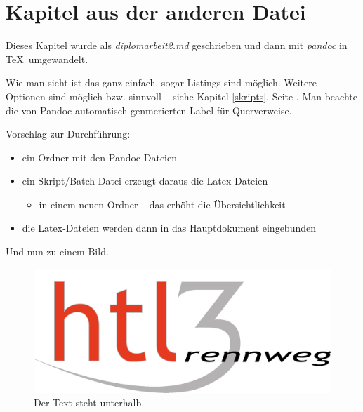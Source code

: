 \hypertarget{kapitel-aus-der-anderen-datei}{%
\section{Kapitel aus der anderen
Datei}\label{kapitel-aus-der-anderen-datei}}

Dieses Kapitel wurde als \emph{diplomarbeit2.md} geschrieben und dann
mit \emph{pandoc} in \TeX~umgewandelt.

\begin{Shaded}
\begin{Highlighting}[]
\end{Highlighting}
\end{Shaded}

Wie man sieht ist das ganz einfach, sogar Listings sind möglich. Weitere
Optionen sind möglich bzw. sinnvoll -- siehe Kapitel \ref{skripts},
Seite \pageref{skripts}. Man beachte die von Pandoc automatisch
genmerierten Label für Querverweise.

Vorschlag zur Durchführung:

\begin{itemize}
\tightlist
\item
  ein Ordner mit den Pandoc-Dateien
\item
  ein Skript/Batch-Datei erzeugt daraus die Latex-Dateien

  \begin{itemize}
  \tightlist
  \item
    in einem neuen Ordner -- das erhöht die Übersichtlichkeit
  \end{itemize}
\item
  die Latex-Dateien werden dann in das Hauptdokument eingebunden
\end{itemize}

Und nun zu einem Bild.

\begin{figure}
\centering
\includegraphics{HTL3RLogo.png}
\caption{Der Text steht unterhalb}
\end{figure}

